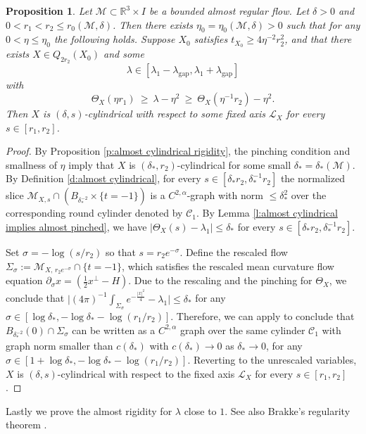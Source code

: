 \documentclass[11pt,reqno]{amsart}
\numberwithin{equation}{section}
\newcommand{\RR}{\mathds{R}}
\newcommand{\cC}{\mathcal{C}}
\newcommand{\cL}{\mathcal{L}}
\newcommand{\cM}{\mathcal{M}}
\newtheorem{proposition}[equation]{Proposition}
\theoremstyle{definition}
\theoremstyle{remark}
\theoremstyle{remark}
\theoremstyle{remark}
\theoremstyle{remark}\newtheorem{conjecture}[equation]{Conjecture}
\theoremstyle{remark}\newtheorem{question}[equation]{Question}
\begin{document}
\begin{proposition}\label{p:propagation-cylinder}
Let $\cM\subset\RR^3\times I$ be a bounded almost regular flow. Let $\delta>0$ and $0<r_1<r_2\le r_0(\cM,\delta)$. Then there exists $\eta_0=\eta_0(\cM,\delta)>0$ such that for any $0<\eta\le\eta_0$ the following holds. Suppose $X_0$ satisfies $t_{X_0}\ge4\eta^{-2}r_2^2$, and that there exists $X\in Q_{2r_2}(X_0)$ and some
\[
\lambda\in[\lambda_1-\lambda_{\mathrm{gap}},\lambda_1+\lambda_{\mathrm{gap}}]
\]
with
\[
\Theta_X(\eta r_1)\ \ge\ \lambda-\eta^2\ \ge\ \Theta_X(\eta^{-1}r_2)-\eta^2.
\]
Then $X$ is $(\delta,s)$-cylindrical with respect to some fixed axis $\cL_X$ for every $s\in[r_1,r_2]$.
\end{proposition}


\begin{proof}
By Proposition \ref{p:almost cylindrical rigidity}, the pinching condition and smallness of $\eta$ imply that $X$ is $(\delta_*,r_2)$-cylindrical for some small $\delta_*=\delta_*(\cM)$. By Definition \ref{d:almost cylindrical}, for every $s\in[\delta_*r_2,\delta_*^{-1}r_2]$ the normalized slice $ \cM_{X,s}\cap (B_{\delta_*^{-2}} \times \{t=-1\})$ is a $C^{2,\alpha}$-graph with norm $\le\delta_*^2$ over the corresponding round cylinder denoted by $\cC_1$. By Lemma \ref{l:almost cylindrical implies almost pinched}, we have $|\Theta_X(s) - \lambda_1 | \le \delta_*$  for every $s\in[\delta_*r_2,\delta_*^{-1}r_2]$.


Set $\sigma=-\log(s/r_2)$ so that $s=r_2e^{-\sigma}$. Define the rescaled flow $\Sigma_{\sigma}:=\cM_{X,\,r_2e^{-\sigma}}\cap\{t=-1\}$, which satisfies the rescaled mean curvature flow equation $\partial_{\sigma} x=(\tfrac12x^\perp-H)$. Due to the rescaling and the pinching for $\Theta_X$, we conclude that $\big|(4\pi)^{-1}\int_{\Sigma_{\sigma}} e^{-\frac{|x|^2}{4}} - \lambda_1 \big| \le \delta_*$ for any $\sigma\in [\log \delta_*,-\log\delta_*-\log(r_1/r_2)]$. Therefore, we can apply \cite[Theorem 0.5]{CM25} to conclude that $B_{\delta_*^{-2}}(0)\cap\Sigma_{\sigma}$ can be written as a $C^{2,\alpha}$ graph over the same cylinder $\cC_1$ with graph norm smaller than $c(\delta_*)$ with $c(\delta_*) \to 0$ as $\delta_* \to 0$, for any $\sigma \in [1+\log\delta_*, -\log\delta_*-\log(r_1/r_2)]$. Reverting to the unrescaled variables, $X$ is $(\delta,s)$-cylindrical with respect to the fixed axis $\cL_X$ for every $s\in[r_1,r_2]$.
\end{proof}


Lastly we prove the almost rigidity for $\lambda$ close to $1$. See also Brakke's regularity theorem \cite{Bra78,Wh05,KT14,DPGS24}.
\end{document}
